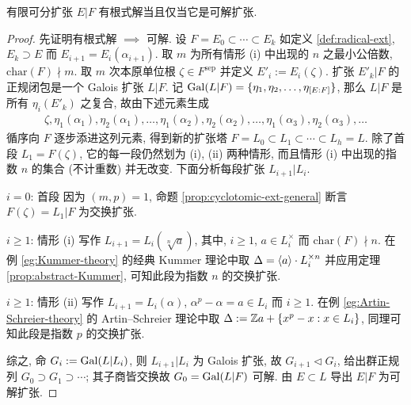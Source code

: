 \begin{theorem}[É.\ Galois]\label{prop:characterization-solvable-radicals}
	有限可分扩张 $E|F$ 有根式解当且仅当它是可解扩张.
\end{theorem}
\begin{proof}
	先证明有根式解 $\implies$ 可解. 设 $F = E_0 \subset \cdots \subset E_k$ 如定义 \ref{def:radical-ext}, $E_k \supset  E$ 而 $E_{i+1} = E_i(\alpha_{i+1})$. 取 $m$ 为所有情形 (i) 中出现的 $n$ 之最小公倍数, $\text{char}(F) \nmid m$. 取 $m$ 次本原单位根 $\zeta \in F^\text{sep}$ 并定义 $E'_i := E_i(\zeta)$. 扩张 $E'_k|F$ 的正规闭包是一个 Galois 扩张 $L|F$. 记 $\operatorname{Gal}(L|F) = \{ \eta_1, \eta_2, \ldots, \eta_{[E:F]} \}$, 那么 $L|F$ 是所有 $\eta_i(E'_k)$ 之复合, 故由下述元素生成
	\begin{gather*}
		\zeta, \eta_1(\alpha_1), \eta_2(\alpha_1), \ldots, \eta_1(\alpha_2), \eta_2(\alpha_2), \ldots, \eta_1(\alpha_3), \eta_2(\alpha_3), \ldots
	\end{gather*}
	循序向 $F$ 逐步添进这列元素, 得到新的扩张塔 $F = L_0 \subset L_1 \subset \cdots \subset L_h = L$. 除了首段 $L_1 = F(\zeta)$, 它的每一段仍然划为 (i), (ii) 两种情形, 而且情形 (i) 中出现的指数 $n$ 的集合 (不计重数) 并无改变. 下面分析每段扩张 $L_{i+1}|L_i$.
	\begin{compactdesc}
		\item[$i=0$: 首段] 因为 $(m,p)=1$, 命题 \ref{prop:cyclotomic-ext-general} 断言 $F(\zeta)=L_1|F$ 为交换扩张.
		\item[$i \geq 1$: 情形 (i)] 写作 $L_{i+1} = L_i(\sqrt[n]{a})$, 其中, $i \geq 1$, $a \in L_i^\times$ 而 $\text{char}(F) \nmid n$. 在例 \ref{eg:Kummer-theory} 的经典 Kummer 理论中取 $\Delta = \left\langle a \right\rangle \cdot L_i^{\times n}$ 并应用定理 \ref{prop:abstract-Kummer}, 可知此段为指数 $n$ 的交换扩张.
		\item[$i \geq 1$: 情形 (ii)] 写作 $L_{i+1} = L_i(\alpha)$, $\alpha^p - \alpha = a \in L_i$ 而 $i \geq 1$. 在例 \ref{eg:Artin-Schreier-theory} 的 Artin--Schreier 理论中取 $\Delta := \mathbb{Z} a + \{x^p-x : x \in L_i\}$, 同理可知此段是指数 $p$ 的交换扩张.
	\end{compactdesc}
	综之, 命 $G_i := \operatorname{Gal}(L|L_i)$, 则 $L_{i+1}|L_i$ 为 Galois 扩张, 故 $G_{i+1} \lhd G_i$, 给出群正规列 $G_0 \supset G_1 \supset \cdots$; 其子商皆交换故 $G_0 = \operatorname{Gal}(L|F)$ 可解. 由 $E \subset L$ 导出 $E|F$ 为可解扩张.

\end{proof}
